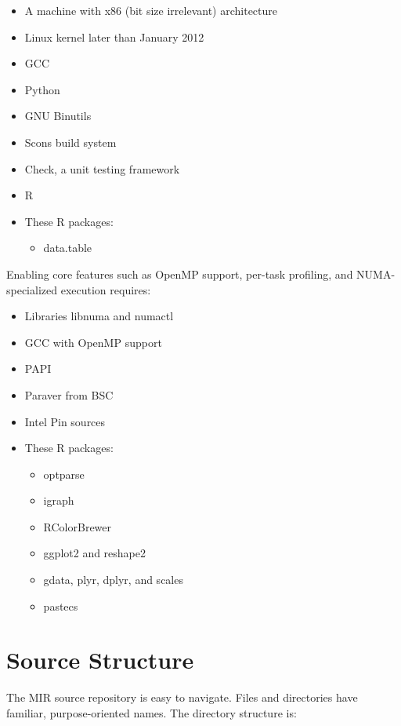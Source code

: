 \documentclass[11pt,a4paper]{article}
\begin{document}
\begin{itemize}
    \item A machine with x86 (bit size irrelevant) architecture
    \item Linux kernel later than January 2012
    \item GCC
    \item Python
    \item GNU Binutils
    \item Scons build system
    \item Check, a unit testing framework
    \item R
    \item These R packages:
    \begin{itemize}
        \item data.table
    \end{itemize}
\end{itemize}

Enabling core features such as OpenMP support, per-task profiling, and NUMA-specialized execution requires:

\begin{itemize}
    \item Libraries libnuma and numactl
    \item GCC with OpenMP support
    \item PAPI
    \item Paraver from BSC
    \item Intel Pin sources
    \item These R packages:
    \begin{itemize}
        \item optparse
        \item igraph
        \item RColorBrewer
        \item ggplot2 and reshape2
        \item gdata, plyr, dplyr, and scales
        \item pastecs
    \end{itemize}
\end{itemize}

\section{Source Structure}\label{sec:source-structure}

The MIR source repository is easy to navigate. Files and directories have familiar, purpose-oriented names. The directory structure is:
\end{document}
